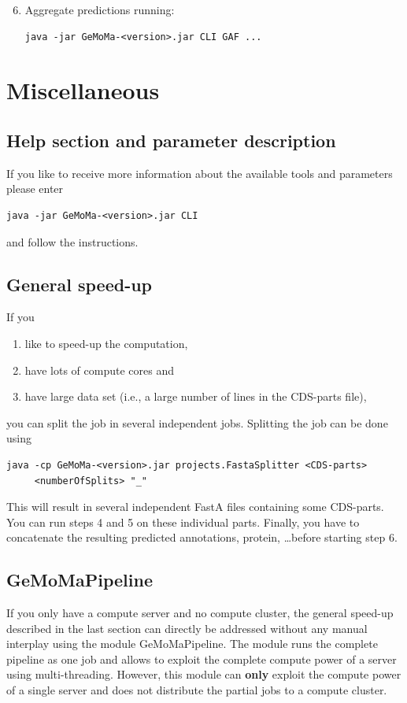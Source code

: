 \documentclass{article}
\begin{document}
\begin{enumerate}
\setcounter{enumi}{5}
\item Aggregate predictions running: 
\begin{verbatim}
java -jar GeMoMa-<version>.jar CLI GAF ...
\end{verbatim}
\end{enumerate}

\clearpage
\section{Miscellaneous}

\subsection{Help section and parameter description}
If you like to receive more information about the available tools and parameters please enter
\begin{verbatim}
java -jar GeMoMa-<version>.jar CLI
\end{verbatim}
and follow the instructions.

\subsection{General speed-up}
If you
\begin{enumerate}
\item like to speed-up the computation,
\item have lots of compute cores and
\item have large data set (i.e., a large number of lines in the CDS-parts file),
\end{enumerate}
you can split the job in several independent jobs. Splitting the job can be done using
\begin{verbatim}
java -cp GeMoMa-<version>.jar projects.FastaSplitter <CDS-parts> 
     <numberOfSplits> "_"
\end{verbatim}

This will result in several independent FastA files containing some CDS-parts. You can run steps 4 and 5 on these individual parts.
Finally, you have to concatenate the resulting predicted annotations, protein, \ldots before starting step 6.

\subsection{GeMoMaPipeline}
If you only have a compute server and no compute cluster, the general speed-up described in the last section can directly be addressed without any manual interplay using the module GeMoMaPipeline. The module runs the complete pipeline as one job and allows to exploit the complete compute power of a server using multi-threading. 
However, this module can \textbf{only} exploit the compute power of a single server and does not distribute the partial jobs to a compute cluster.
\end{document}
